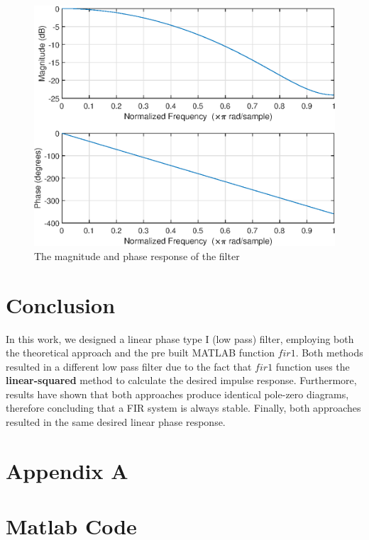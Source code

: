 \documentclass[12pt]{IEEEtran}
\begin{document}
\begin{figure}
   \includegraphics[scale=0.6]{magphse.eps}
   \caption{The magnitude and phase response of the filter}
\end{figure}  

\section{Conclusion}
In this work, we designed a linear phase type I (low pass) filter, employing both the theoretical approach and the pre built MATLAB function $fir1$. Both methods resulted in a different low pass filter due to the fact that $fir1$ function uses the \textbf{linear-squared} method to calculate the desired impulse response. Furthermore, results have shown that both approaches produce identical pole-zero diagrams, therefore concluding that a FIR system is always stable. Finally, both approaches resulted in the same desired linear phase response. 

\section{Appendix A}
\label{sec:A}



\section*{Matlab Code}


\end{document}
